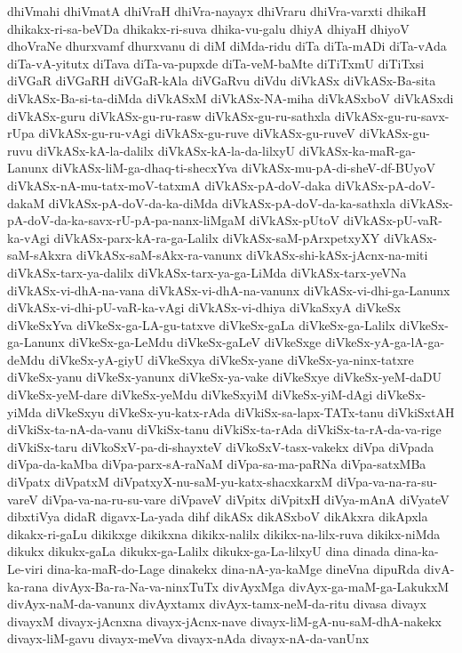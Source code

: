 {dhiVmahi
dhiVmatA
dhiVraH
dhiVra-nayayx
dhiVraru
dhiVra-varxti
dhikaH
dhikakx-ri-sa-beVDa
dhikakx-ri-suva
dhika-vu-galu
dhiyA
dhiyaH
dhiyoV
dhoVraNe
dhurxvamf
dhurxvanu
di
diM
diMda-ridu
diTa
diTa-mADi
diTa-vAda
diTa-vA-yitutx
diTava
diTa-va-pupxde
diTa-veM-baMte
diTiTxmU
diTiTxsi
diVGaR
diVGaRH
diVGaR-kAla
diVGaRvu
diVdu
diVkASx
diVkASx-Ba-sita
diVkASx-Ba-si-ta-diMda
diVkASxM
diVkASx-NA-miha
diVkASxboV
diVkASxdi
diVkASx-guru
diVkASx-gu-ru-rasw
diVkASx-gu-ru-sathxla
diVkASx-gu-ru-savx-rUpa
diVkASx-gu-ru-vAgi
diVkASx-gu-ruve
diVkASx-gu-ruveV
diVkASx-gu-ruvu
diVkASx-kA-la-dalilx
diVkASx-kA-la-da-lilxyU
diVkASx-ka-maR-ga-Lanunx
diVkASx-liM-ga-dhaq-ti-shecxYva
diVkASx-mu-pA-di-sheV-df-BUyoV
diVkASx-nA-mu-tatx-moV-tatxmA
diVkASx-pA-doV-daka
diVkASx-pA-doV-dakaM
diVkASx-pA-doV-da-ka-diMda
diVkASx-pA-doV-da-ka-sathxla
diVkASx-pA-doV-da-ka-savx-rU-pA-pa-nanx-liMgaM
diVkASx-pUtoV
diVkASx-pU-vaR-ka-vAgi
diVkASx-parx-kA-ra-ga-Lalilx
diVkASx-saM-pArxpetxyXY
diVkASx-saM-sAkxra
diVkASx-saM-sAkx-ra-vanunx
diVkASx-shi-kASx-jAcnx-na-miti
diVkASx-tarx-ya-dalilx
diVkASx-tarx-ya-ga-LiMda
diVkASx-tarx-yeVNa
diVkASx-vi-dhA-na-vana
diVkASx-vi-dhA-na-vanunx
diVkASx-vi-dhi-ga-Lanunx
diVkASx-vi-dhi-pU-vaR-ka-vAgi
diVkASx-vi-dhiya
diVkaSxyA
diVkeSx
diVkeSxYva
diVkeSx-ga-LA-gu-tatxve
diVkeSx-gaLa
diVkeSx-ga-Lalilx
diVkeSx-ga-Lanunx
diVkeSx-ga-LeMdu
diVkeSx-gaLeV
diVkeSxge
diVkeSx-yA-ga-lA-ga-deMdu
diVkeSx-yA-giyU
diVkeSxya
diVkeSx-yane
diVkeSx-ya-ninx-tatxre
diVkeSx-yanu
diVkeSx-yanunx
diVkeSx-ya-vake
diVkeSxye
diVkeSx-yeM-daDU
diVkeSx-yeM-dare
diVkeSx-yeMdu
diVkeSxyiM
diVkeSx-yiM-dAgi
diVkeSx-yiMda
diVkeSxyu
diVkeSx-yu-katx-rAda
diVkiSx-sa-lapx-TATx-tanu
diVkiSxtAH
diVkiSx-ta-nA-da-vanu
diVkiSx-tanu
diVkiSx-ta-rAda
diVkiSx-ta-rA-da-va-rige
diVkiSx-taru
diVkoSxV-pa-di-shayxteV
diVkoSxV-tasx-vakekx
diVpa
diVpada
diVpa-da-kaMba
diVpa-parx-sA-raNaM
diVpa-sa-ma-paRNa
diVpa-satxMBa
diVpatx
diVpatxM
diVpatxyX-nu-saM-yu-katx-shacxkarxM
diVpa-va-na-ra-su-vareV
diVpa-va-na-ru-su-vare
diVpaveV
diVpitx
diVpitxH
diVya-mAnA
diVyateV
dibxtiVya
didaR
digavx-La-yada
dihf
dikASx
dikASxboV
dikAkxra
dikApxla
dikakx-ri-gaLu
dikikxge
dikikxna
dikikx-nalilx
dikikx-na-lilx-ruva
dikikx-niMda
dikukx
dikukx-gaLa
dikukx-ga-Lalilx
dikukx-ga-La-lilxyU
dina
dinada
dina-ka-Le-viri
dina-ka-maR-do-Lage
dinakekx
dina-nA-ya-kaMge
dineVna
dipuRda
divA-ka-rana
divAyx-Ba-ra-Na-va-ninxTuTx
divAyxMga
divAyx-ga-maM-ga-LakukxM
divAyx-naM-da-vanunx
divAyxtamx
divAyx-tamx-neM-da-ritu
divasa
divayx
divayxM
divayx-jAcnxna
divayx-jAcnx-nave
divayx-liM-gA-nu-saM-dhA-nakekx
divayx-liM-gavu
divayx-meVva
divayx-nAda
divayx-nA-da-vanUnx
}

